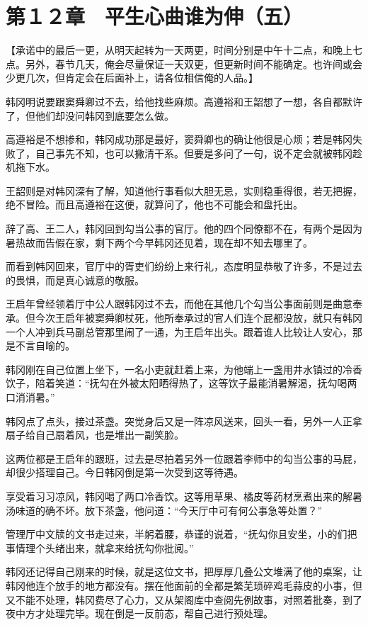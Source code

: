 \section{第１２章　平生心曲谁为伸（五）}

【承诺中的最后一更，从明天起转为一天两更，时间分别是中午十二点，和晚上七点。另外，春节几天，俺会尽量保证一天双更，但更新时间不能确定。也许间或会少更几次，但肯定会在后面补上，请各位相信俺的人品。】

韩冈明说要跟窦舜卿过不去，给他找些麻烦。高遵裕和王韶想了一想，各自都默许了，但他们却没问韩冈到底要怎么做。

高遵裕是不想掺和，韩冈成功那是最好，窦舜卿也的确让他很是心烦；若是韩冈失败了，自己事先不知，也可以撇清干系。但要是多问了一句，说不定会就被韩冈趁机拖下水。

王韶则是对韩冈深有了解，知道他行事看似大胆无忌，实则稳重得很，若无把握，绝不冒险。而且高遵裕在这便，就算问了，他也不可能会和盘托出。

辞了高、王二人，韩冈回到勾当公事的官厅。他的四个同僚都不在，有两个是因为暑热故而告假在家，剩下两个今早韩冈还见着，现在却不知去哪里了。

而看到韩冈回来，官厅中的胥吏们纷纷上来行礼，态度明显恭敬了许多，不是过去的畏惧，而是真心诚意的敬服。

王启年曾经领着厅中公人跟韩冈过不去，而他在其他几个勾当公事面前则是曲意奉承。但今次王启年被窦舜卿杖死，他所奉承过的官人们连个屁都没放，就只有韩冈一个人冲到兵马副总管那里闹了一通，为王启年出头。跟着谁人比较让人安心，那是不言自喻的。

韩冈刚在自己位置上坐下，一名小吏就赶着上来，为他端上一盏用井水镇过的冷香饮子，陪着笑道：“抚勾在外被太阳晒得热了，这等饮子最能消暑解渴，抚勾喝两口消消暑。”

韩冈点了点头，接过茶盏。突觉身后又是一阵凉风送来，回头一看，另外一人正拿扇子给自己扇着风，也是堆出一副笑脸。

这两位都是王启年的跟班，过去是尽拍着另外一位跟着李师中的勾当公事的马屁，却很少搭理自己。今日韩冈倒是第一次受到这等待遇。

享受着习习凉风，韩冈喝了两口冷香饮。这等用草果、橘皮等药材烹煮出来的解暑汤味道的确不坏。放下茶盏，他问道：“今天厅中可有何公事急等处置？”

管理厅中文牍的文书走过来，半躬着腰，恭谨的说着，“抚勾你且安坐，小的们把事情理个头绪出来，就拿来给抚勾你批阅。”

韩冈还记得自己刚来的时候，就是这位文书，把厚厚几叠公文堆满了他的桌案，让韩冈他连个放手的地方都没有。摆在他面前的全都是繁芜琐碎鸡毛蒜皮的小事，但又不能不处理，韩冈费尽了心力，又从架阁库中查阅先例故事，对照着批奏，到了夜中方才处理完毕。现在倒是一反前态，帮自己进行预处理。

